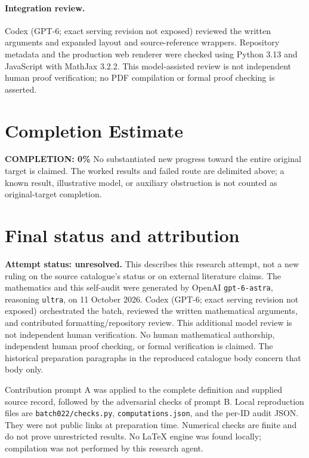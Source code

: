 \documentclass[11pt]{article}
\begin{document}
\paragraph{Integration review.} Codex (GPT-6; exact serving revision not exposed) reviewed the written arguments and expanded layout and source-reference wrappers. Repository metadata and the production web renderer were checked using Python 3.13 and JavaScript with MathJax 3.2.2. This model-assisted review is not independent human proof verification; no PDF compilation or formal proof checking is asserted.

\section{Completion Estimate}
\noindent\textbf{COMPLETION: 0\%}
No substantiated new progress toward the entire original target is claimed. The worked results and failed route are delimited above; a known result, illustrative model, or auxiliary obstruction is not counted as original-target completion.

\section{Final status and attribution}
\textbf{Attempt status: unresolved.} This describes this research attempt, not a new ruling on the source catalogue's status or on external literature claims.
The mathematics and this self-audit were generated by OpenAI \texttt{gpt-6-astra}, reasoning \texttt{ultra}, on 11 October 2026. Codex (GPT-6; exact serving revision not exposed) orchestrated the batch, reviewed the written mathematical arguments, and contributed formatting/repository review. This additional model review is not independent human verification. No human mathematical authorship, independent human proof checking, or formal verification is claimed. The historical preparation paragraphs in the reproduced catalogue body concern that body only.

Contribution prompt A was applied to the complete definition and supplied source record, followed by the adversarial checks of prompt B. Local reproduction files are \texttt{batch022/checks.py}, \texttt{computations.json}, and the per-ID audit JSON. They were not public links at preparation time. Numerical checks are finite and do not prove unrestricted results. No LaTeX engine was found locally; compilation was not performed by this research agent.
\end{document}
